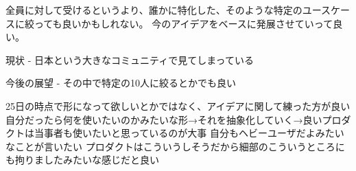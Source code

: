 全員に対して受けるというより、誰かに特化した、そのような特定のユースケースに絞っても良いかもしれない。
今のアイデアをベースに発展させていって良い。

現状
- 日本という大きなコミュニティで見てしまっている

今後の展望
- その中で特定の10人に絞るとかでも良い

25日の時点で形になって欲しいとかではなく、アイデアに関して練った方が良い
自分だったら何を使いたいのかみたいな形→それを抽象化していく→良いプロダクトは当事者も使いたいと思っているのが大事
自分もヘビーユーザだよみたいなことが言いたい
プロダクトはこういうしそうだから細部のこういうところにも拘りましたみたいな感じだと良い
